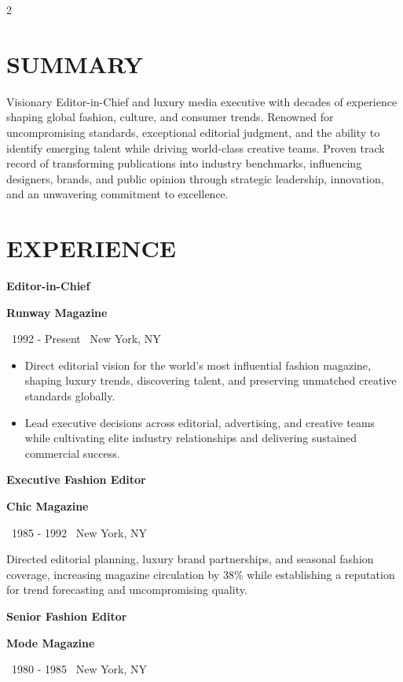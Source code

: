 \documentclass[11pt, a4paper]{article}
\newcommand{\resumeentry}[4]{

  \par\vspace{0.5em}
  {\color{enhancvgray}\bfseries\Large{#1}}\par
  {\color{enhancvblue}\bfseries{#2}}\par
  {\footnotesize
  {\color{lightgray}\faCalendar}\ {\color{mediumgray}#3} \qquad {\color{lightgray}\faMapMarker}\ {\color{mediumgray}#4}\par
}
  \vspace{0.2em}

}
\begin{document}
\begin{paracol}{2} 



\section{SUMMARY}


Visionary Editor-in-Chief and luxury media executive with decades of experience shaping global fashion, culture, and consumer trends. Renowned for uncompromising standards, exceptional editorial judgment, and the ability to identify emerging talent while driving world-class creative teams. Proven track record of transforming publications into industry benchmarks, influencing designers, brands, and public opinion through strategic leadership, innovation, and an unwavering commitment to excellence.


\section{EXPERIENCE}




\resumeentry{Editor-in-Chief}{Runway Magazine}{1992 - Present}{New York, NY}


\begin{itemize}[leftmargin=*, noitemsep, topsep=0pt]

    \item Direct editorial vision for the world's most influential fashion magazine, shaping luxury trends, discovering talent, and preserving unmatched creative standards globally.

    \item Lead executive decisions across editorial, advertising, and creative teams while cultivating elite industry relationships and delivering sustained commercial success.

\end{itemize}


\resumeentry{Executive Fashion Editor}{Chic Magazine}{1985 - 1992}{New York, NY}

Directed editorial planning, luxury brand partnerships, and seasonal fashion coverage, increasing magazine circulation by 38\% while establishing a reputation for trend forecasting and uncompromising quality.\par



\resumeentry{Senior Fashion Editor}{Mode Magazine}{1980 - 1985}{New York, NY}


\end{paracol}
\end{document}
